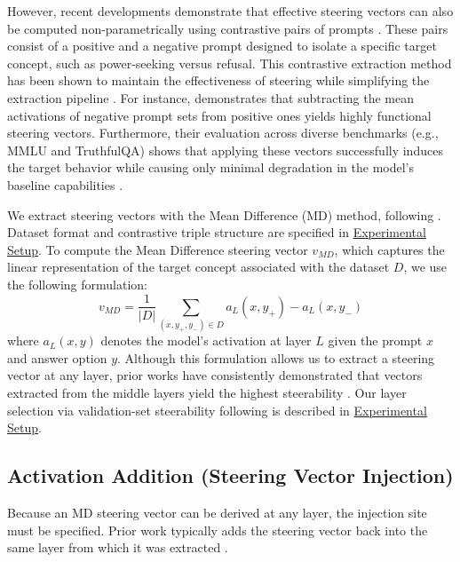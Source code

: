 However, recent developments demonstrate that effective steering vectors can also be computed non-parametrically using contrastive pairs of prompts \citep{turnerSteeringLanguageModels2023}.
These pairs consist of a positive and a negative prompt designed to isolate a specific target concept, such as power-seeking versus refusal.
This contrastive extraction method has been shown to maintain the effectiveness of steering while simplifying the extraction pipeline \citep{turnerSteeringLanguageModels2023, rimskySteeringLlama22024}. For instance, \cite{rimskySteeringLlama22024} demonstrates that subtracting the mean activations of negative prompt sets from positive ones yields highly functional steering vectors. Furthermore, their evaluation across diverse benchmarks (e.g., MMLU and TruthfulQA) shows that applying these vectors successfully induces the target behavior while causing only minimal degradation in the model's baseline capabilities \citep{rimskySteeringLlama22024}.

We extract steering vectors with the Mean Difference (MD) method, following \cite{rimskySteeringLlama22024}.
Dataset format and contrastive triple structure are specified in \hyperref[sec:experimental-setup]{Experimental Setup}.
To compute the Mean Difference steering vector $v_{MD}$, which captures the linear representation of the target concept associated with the dataset $D$, we use the following formulation:
$$v_{MD}=\frac{1}{|D|}\sum_{(x,y_+,y_-)\in D}a_L(x,y_+)-a_L(x,y_-)$$
where $a_L(x,y)$ denotes the model's activation at layer $L$ given the prompt $x$ and answer option $y$.
Although this formulation allows us to extract a steering vector at any layer, prior works have consistently demonstrated that vectors extracted from the middle layers yield the highest steerability \citep{turnerSteeringLanguageModels2023, rimskySteeringLlama22024, tanAnalysingGeneralisationReliability2024}.
Our layer selection via validation-set steerability following \cite{tanAnalysingGeneralisationReliability2024} is described in \hyperref[sec:experimental-setup]{Experimental Setup}.

\subsection{Activation Addition (Steering Vector Injection)}\label{sec:bg_injection}
Because an MD steering vector can be derived at any layer, the injection site must be specified.
Prior work typically adds the steering vector back into the same layer from which it was extracted \citep{rimskySteeringLlama22024}.

